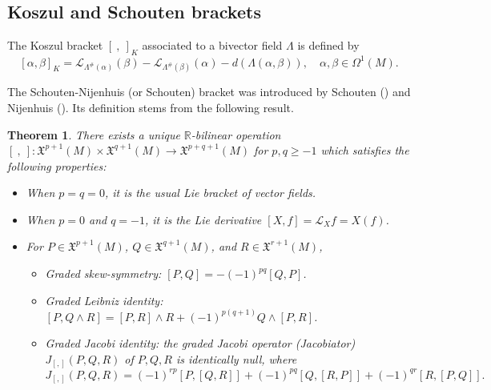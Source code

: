 \documentclass[a4paper,10pt]{article}
\numberwithin{equation}{section}
\theoremstyle{plain}
\newtheorem{theorem}{Theorem}[section]
\begin{document}
	\subsection{Koszul and Schouten brackets}
The Koszul bracket $[\ ,\ ]_K$ associated to a bivector field $\Lambda$ is defined by
$$[\alpha,\beta]_K=\mathcal{L}_{\Lambda^\#(\alpha)}(\beta)- \mathcal{L}_{\Lambda^\#(\beta)}(\alpha)-d(\Lambda(\alpha,\beta)), \quad\alpha,\beta\in \Omega^1(M).$$

The Schouten-Nijenhuis (or Schouten) bracket was introduced by Schouten (\cite{RS}) and Nijenhuis (\cite{RN}). Its definition stems from the following result.
\begin{theorem}\cite[Theorem 2.8]{R9}\label{ui}
	There exists a unique $\mathbb{R}$-bilinear operation $[\ ,\ ]: \mathfrak{X}^{p+1}(M)\times \mathfrak{X}^{q+1}(M)\longrightarrow \mathfrak{X}^{p+q+1}(M)$ for $p,q\geq -1$
	which satisfies the following properties:
	\begin{itemize}
		\item[(i)] When $p=q=0$, it is the usual Lie bracket of vector fields.
		\item[(ii)] When $p=0$ and $q=-1$, it is the Lie derivative $[X,f]=\mathcal{L}_Xf=X(f)$.
		
		\item For $P\in\mathfrak{X}^{p+1}(M)$, $Q\in \mathfrak{X}^{q+1}(M)$, and $R\in \mathfrak{X}^{r+1}(M)$,
		\begin{itemize}
			\item[(iii)] Graded skew-symmetry: $[P,Q]=-(-1)^{pq}[Q,P]$.
			\item[(iv)] Graded Leibniz identity: $[P,Q\wedge R]=[P,R]\wedge R+(-1)^{p(q+1)}Q\wedge[P,R]$.
			\item[(v)] Graded Jacobi identity: the graded Jacobi operator (Jacobiator) $J_{[,]}(P,Q,R)$ of $P,Q,R$ is identically null, where
			$$
			J_{[,]}(P,Q,R) = (-1)^{rp}[P,[Q,R]] + (-1)^{pq}[Q,[R,P]] + (-1)^{qr}[R,[P,Q]].
			$$
		\end{itemize}
	\end{itemize}
\end{theorem}
\end{document}

